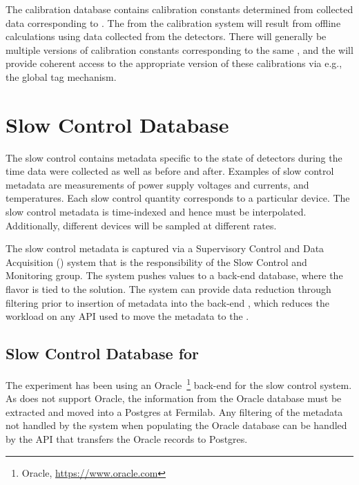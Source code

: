 \documentclass[../main-v1.tex]{subfiles}
\begin{document}
The calibration database contains calibration constants determined from collected data corresponding to  . The  from the calibration system will result from offline calculations using data collected from the  detectors.
There will generally be multiple versions of calibration constants corresponding to the same , and the  will provide coherent access to the appropriate version of these calibrations via e.g., the global tag mechanism.

\section{Slow Control Database }
\label{sec:db:slowcontrol}  

The slow control  contains metadata specific to the state of detectors during the time data were collected as well as before and after. Examples of slow control metadata are measurements of power supply voltages and currents, and temperatures. Each slow control quantity corresponds to a particular device. The slow control  metadata is time-indexed and hence must be interpolated. Additionally, different devices will be sampled at different rates.

The slow control metadata is captured via a Supervisory Control and Data Acquisition () system that is the responsibility of the Slow Control and Monitoring group. The   system pushes values to a back-end database, where the  flavor is tied to the  solution. 
The   system can provide data reduction through filtering prior to insertion of metadata into the back-end , which reduces the workload on any API used to move the metadata to the . 

\subsection{Slow Control Database for }
\label{sec:slowcontrolPD}

The  experiment has been using an Oracle~\footnote{Oracle\textcopyright, \url{https://www.oracle.com}} back-end  for the slow control system. As 
does not support Oracle, the information from the Oracle database must be extracted and moved into a Postgres  at Fermilab. Any filtering of the metadata not handled by the   system when populating the Oracle database can be handled by the API that transfers the Oracle records to Postgres.
\end{document}
